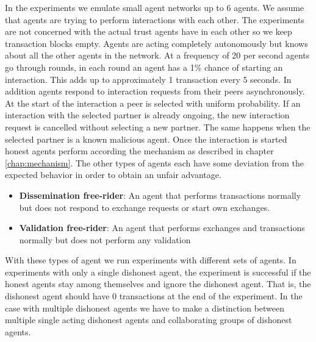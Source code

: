 
In the experiments we emulate small agent networks up to 6 agents. We assume that agents are trying to perform 
interactions with each other. The experiments are not concerned with the actual trust agents have 
in each other so we keep transaction blocks empty. Agents are acting completely autonomously 
but knows about all the other agents in the network. At a frequency of 20 per second agents go through
rounds, in each round an agent has a 1\% chance of starting an interaction. This adds up to approximately
1 transaction every 5 seconds. In addition agents respond to interaction requests from their peers 
asynchronously. At the start of the interaction a peer is selected with uniform probability. If an
interaction with the selected partner is already ongoing, the new interaction request is cancelled
without selecting a new partner. The same happens when the selected partner is a known malicious 
agent. Once the interaction is started honest agents perform according the mechanism as described in
chapter \ref{chap:mechanism}. The other types of agents each have some deviation from the expected
behavior in order to obtain an unfair advantage.

\begin{itemize}
    \item \textbf{Dissemination free-rider}: An agent that performs transactions normally but does
    not respond to exchange requests or start own exchanges.
    \item \textbf{Validation free-rider}: An agent that performs exchanges and transactions normally
    but does not perform any validation
\end{itemize}

With these types of agent we run experiments with different sets of agents. In experiments with only
a single dishonest agent, the experiment is successful if the honest agents stay among themselves
and ignore the dishonest agent. That is, the dishonest agent should have 0 transactions at the end
of the experiment. In the case with multiple dishonest agents we have to make a distinction between
multiple single acting dishonest agents and collaborating groups of dishonest agents. 

